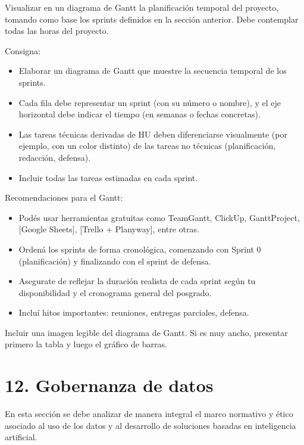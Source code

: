 \documentclass[
11pt, %
]{charter}
\begin{document}
Visualizar en un diagrama de Gantt la planificación temporal del proyecto, tomando como base los sprints definidos en la sección anterior. Debe contemplar todas las horas del proyecto.

Consigna:

\begin{itemize}

\item Elaborar un diagrama de Gantt que muestre la secuencia temporal de los sprints.

\item Cada fila debe representar un sprint (con su número o nombre), y el eje horizontal debe indicar el tiempo (en semanas o fechas concretas).

\item Las tareas técnicas derivadas de HU deben diferenciarse visualmente (por ejemplo, con un color distinto) de las tareas no técnicas (planificación, redacción, defensa).

\item Incluir todas las tareas estimadas en cada sprint.
\end{itemize}

Recomendaciones para el Gantt:

\begin{itemize}

	\item Podés usar herramientas gratuitas como TeamGantt, ClickUp, GanttProject, [Google Sheets], [Trello + Planyway], entre otras.
	\item Ordená los sprints de forma cronológica, comenzando con Sprint 0 (planificación) y finalizando con el sprint de defensa.
	\item Asegurate de reflejar la duración realista de cada sprint según tu disponibilidad y el cronograma general del posgrado.
	\item Incluí hitos importantes: reuniones, entregas parciales, defensa.
\end{itemize}


Incluir una imagen legible del diagrama de Gantt. Si es muy ancho, presentar primero la tabla y luego el gráfico de barras.



\section{12. Gobernanza de datos}
\label{sec:gobernanza}

En esta sección se debe analizar de manera integral el marco normativo y ético asociado al uso de los datos y al desarrollo de soluciones basadas en inteligencia artificial.
\end{document}
